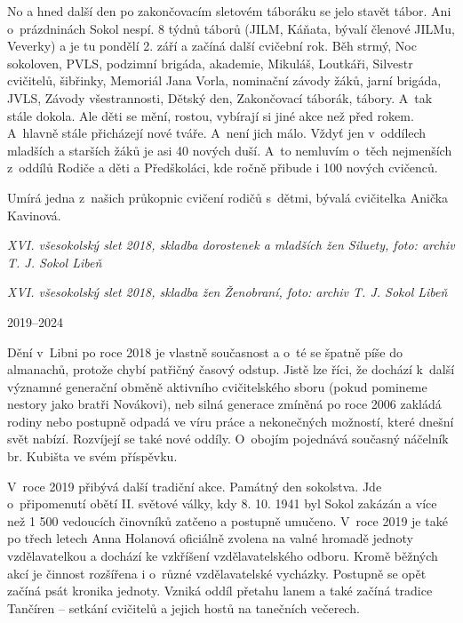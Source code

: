 \documentclass[a5paper, 12pt, twoside]{article}
\begin{document}
No a hned další den po zakončovacím sletovém táboráku se jelo stavět
tábor. Ani o~prázdninách Sokol nespí. 8 týdnů táborů (JILM, Káňata,
bývalí členové JILMu, Veverky) a je tu pondělí 2. září a začíná další
cvičební rok. Běh strmý, Noc sokoloven, PVLS, podzimní brigáda,
akademie, Mikuláš, Loutkáři, Silvestr cvičitelů, šibřinky, Memoriál Jana
Vorla, nominační závody žáků, jarní brigáda, JVLS, Závody všestrannosti,
Dětský den, Zakončovací táborák, tábory. A~tak stále dokola. Ale děti se
mění, rostou, vybírají si jiné akce než před rokem. A~hlavně stále
přicházejí nové tváře. A~není jich málo. Vždyť jen v~oddílech mladších a
starších žáků je asi 40 nových duší. A~to nemluvím o~těch nejmenších
z~oddílů Rodiče a děti a Předškoláci, kde ročně přibude i 100 nových
cvičenců.

Umírá jedna z~našich průkopnic cvičení rodičů s~dětmi, bývalá cvičitelka
Anička Kavinová.


\textit{XVI. všesokolský slet 2018, skladba dorostenek a mladších žen
Siluety, foto: archiv T. J. Sokol Libeň}


\textit{XVI. všesokolský slet 2018, skladba žen Ženobraní, foto: archiv T.
J. Sokol Libeň}

2019--2024

Dění v~Libni po roce 2018 je vlastně současnost a o~té se špatně píše do
almanachů, protože chybí patřičný časový odstup. Jistě lze říci, že
dochází k~další významné generační obměně aktivního cvičitelského sboru
(pokud pomineme nestory jako bratři Novákovi), neb silná generace
zmíněná po roce 2006 zakládá rodiny nebo postupně odpadá ve víru práce a
nekonečných možností, které dnešní svět nabízí. Rozvíjejí se také nové
oddíly. O~obojím pojednává současný náčelník br. Kubišta ve svém
příspěvku.

V~roce 2019 přibývá další tradiční akce. Památný den sokolstva. Jde
o~připomenutí obětí II. světové války, kdy 8. 10. 1941 byl Sokol zakázán a
více než 1 500 vedoucích činovníků zatčeno a postupně umučeno. V~roce
2019 je také po třech letech Anna Holanová oficiálně zvolena na valné
hromadě jednoty vzdělavatelkou a dochází ke vzkříšení vzdělavatelského
odboru. Kromě běžných akcí je činnost rozšířena i o~různé vzdělavatelské
vycházky. Postupně se opět začíná psát kronika jednoty. Vzniká oddíl
přetahu lanem a také začíná tradice Tančíren -- setkání cvičitelů a
jejich hostů na tanečních večerech.
\end{document}

